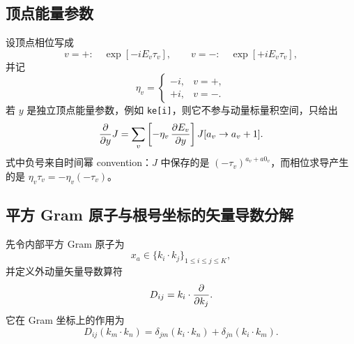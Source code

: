 ﻿\documentclass[a4paper,11pt]{article}
\begin{document}
\subsection{顶点能量参数}

设顶点相位写成
\begin{equation}
  v=+:\quad \exp[-iE_v\tau_v],
  \qquad
  v=-:\quad \exp[+iE_v\tau_v],
\end{equation}
并记
\begin{equation}
  \eta_v=
  \begin{cases}
  -i,& v=+,\\
  +i,& v=-.
  \end{cases}
\end{equation}
若 $y$ 是独立顶点能量参数，例如 \verb|ke[i]|，则它不参与动量标量积空间，只给出
\begin{equation}
  {\partial\over\partial y}J
  =
  \sum_v
  \left[-\eta_v\,{\partial E_v\over\partial y}\right]
  J[a_v\to a_v+1].
  \label{vertexEnergyDerivative}
\end{equation}
式中负号来自时间幂 convention：$J$ 中保存的是 $(-\tau_v)^{a_v+a0_v}$，而相位求导产生的是 $\eta_v\tau_v=-\eta_v(-\tau_v)$。

\subsection{平方 Gram 原子与根号坐标的矢量导数分解}

先令内部平方 Gram 原子为
\begin{equation}
  x_a\in\{k_i\cdot k_j\}_{1\le i\le j\le K},
\end{equation}
并定义外动量矢量导数算符
\begin{equation}
  D_{ij}=k_i\cdot{\partial\over\partial k_j}.
\end{equation}
它在 Gram 坐标上的作用为
\begin{equation}
  D_{ij}(k_m\cdot k_n)
  =
  \delta_{jm}(k_i\cdot k_n)
  +
  \delta_{jn}(k_i\cdot k_m).
  \label{externalVectorGramAction}
\end{equation}
\end{document}
